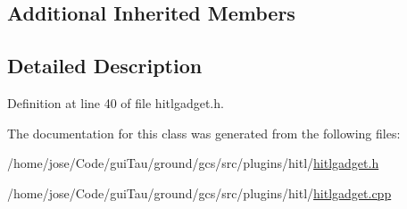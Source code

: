 \subsection*{Additional Inherited Members}


\subsection{Detailed Description}


Definition at line 40 of file hitlgadget.\-h.



The documentation for this class was generated from the following files\-:\begin{DoxyCompactItemize}
\item 
/home/jose/\-Code/gui\-Tau/ground/gcs/src/plugins/hitl/\hyperlink{hitlgadget_8h}{hitlgadget.\-h}\item 
/home/jose/\-Code/gui\-Tau/ground/gcs/src/plugins/hitl/\hyperlink{hitlgadget_8cpp}{hitlgadget.\-cpp}\end{DoxyCompactItemize}
